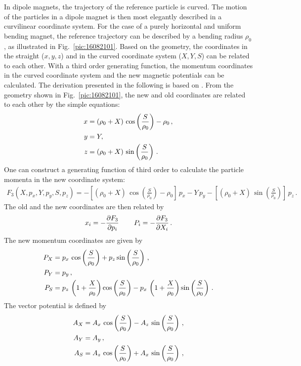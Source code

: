 \begin{appendices}
%
In dipole magnets, the trajectory of the reference particle is curved. The motion of the particles in a dipole magnet is then most elegantly described in a curvilinear coordinate system. For the case of a purely horizontal and uniform bending magnet, the reference trajectory can be described by a bending radius $\rho_0$, as illustrated in Fig.~\ref{pic:16082101}. Based on the geometry, the coordinates in the straight ($x,y,z$) and in the curved coordinate system ($X,Y,S$) can be related to each other. With a third order generating function, the momentum coordinates in the curved coordinate system and the new magnetic potentials can be calculated. The derivation presented in the following is based on \cite{wolski2014beam}. From the geometry shown in Fig.~\ref{pic:16082101}, the new and old coordinates are related to each other by the simple equations:
\begin{align}
x &= (\rho_0 + X) \, \cos \left( \frac{S}{\rho_0} \right) - \rho_0 \, , \notag \\
y &= Y , \\
z &= (\rho_0 + X) \, \sin \left( \frac{S}{\rho_0} \right)  \notag \, .
\end{align}
One can construct a generating function of third order to calculate the particle momenta in the new coordinate system:
\begin{align}
F_3 (X,p_x,Y,p_y,S,p_z) = - \left[ (\rho_0 + X) \, \cos \left( \frac{S}{\rho_0} \right) - \rho_0 \right] \, p_x - Y \, p_y  - \left[ (\rho_0 + X) \, \sin \left( \frac{S}{\rho_0} \right) \right] \, p_z \, . \label{genF:rot}
\end{align}
%
The old and the new coordinates are then related by 
\begin{align}
x_i = - \frac{\partial F_3}{\partial p_i} \, \quad \quad P_i = - \frac{\partial F_3}{\partial X_i} \, .
\end{align}
The new momentum coordinates are given by
\begin{align}
P_X &= p_x \,  \cos \left( \frac{S}{\rho_0} \right) + p_z  \sin \left( \frac{S}{\rho_0} \right) \, , \notag \\
P_Y &= p_y \, , \\
P_S &= p_z \, \left( 1 + \frac{X}{\rho_0} \right)  \cos \left( \frac{S}{\rho_0} \right) - p_x \, \left( 1 + \frac{X}{\rho_0} \right)  \sin \left( \frac{S}{\rho_0} \right) \, . \notag
\end{align}
%
The vector potential is defined by
\begin{align}
A_X &= A_x \, \cos \left( \frac{S}{\rho_0} \right) - A_z \, \sin \left( \frac{S}{\rho_0} \right) \, , \notag \\
A_Y &= A_y \, , \\ 
A_S &= A_z \, \cos \left( \frac{S}{\rho_0} \right) + A_x \, \sin \left( \frac{S}{\rho_0} \right) \, , \notag 
\end{align}




\end{appendices}
